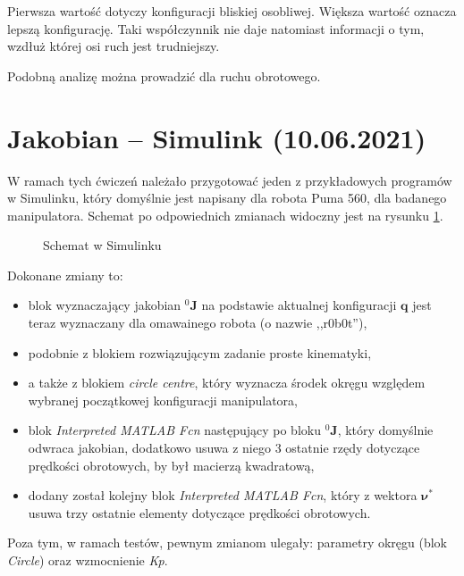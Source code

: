 \documentclass[11pt, a4paper]{article}
\begin{document}
Pierwsza wartość dotyczy konfiguracji bliskiej osobliwej. Większa wartość oznacza lepszą konfigurację. Taki współczynnik nie daje natomiast informacji o tym, wzdłuż której osi ruch jest trudniejszy.

Podobną analizę można prowadzić dla ruchu obrotowego.

\newpage



%
%

\section{Jakobian -- Simulink (10.06.2021)}

W ramach tych ćwiczeń należało przygotować jeden z przykładowych programów w Simulinku, który domyślnie jest napisany dla robota Puma 560, dla badanego manipulatora. Schemat po odpowiednich zmianach widoczny jest na rysunku \ref{fig:jacobianSimulink}.
\begin{figure}[htbp!]
	\centering
	\caption{Schemat w Simulinku \label{fig:jacobianSimulink}}
\end{figure}

Dokonane zmiany to:
\begin{itemize}
\item blok wyznaczający jakobian ${}^{0}\mathbf{J}$ na podstawie aktualnej konfiguracji $\mathbf{q}$ jest teraz wyznaczany dla omawainego robota (o nazwie ,,r0b0t''),
\item podobnie z blokiem rozwiązującym zadanie proste kinematyki,
\item a także z blokiem \emph{circle centre}, który wyznacza środek okręgu względem wybranej początkowej konfiguracji manipulatora,
\item blok \emph{Interpreted MATLAB Fcn} następujący po bloku ${}^{0}\mathbf{J}$, który domyślnie odwraca jakobian, dodatkowo usuwa z niego 3 ostatnie rzędy dotyczące prędkości obrotowych, by był macierzą kwadratową,
\item dodany został kolejny blok \emph{Interpreted MATLAB Fcn}, który z wektora $\boldsymbol{\nu}^{*}$ usuwa trzy ostatnie elementy dotyczące prędkości obrotowych.
\end{itemize}

Poza tym, w ramach testów, pewnym zmianom ulegały: parametry okręgu (blok \emph{Circle}) oraz wzmocnienie \emph{Kp}.\\
\end{document}
